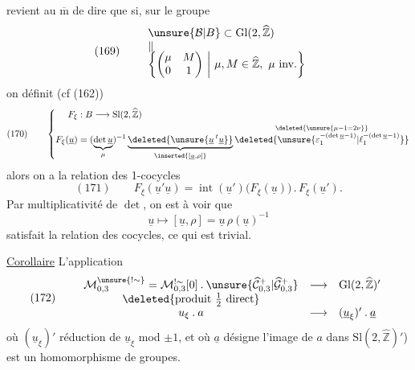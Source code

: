 
 revient au $\overline{\mathrm m}$ de dire que si,
sur le groupe
\[
(169)\qquad
\begin{array}{ll}
\unsure{\mathcal B|B}\subset\mathrm{Gl}(2,\widehat{\mathbb Z})&\\
\Vert&\\[-2pt]
\left\{\begin{pmatrix}\mu&M\\0&1\end{pmatrix}
\ \middle|\ \mu,M\in\widehat{\mathbb Z},\ \mu\text{ inv.}\right\}&
\end{array}
\]
on définit (cf (162))
\[
(170)\qquad
\left\{\begin{aligned}
F_\xi &: B\longrightarrow\mathrm{Sl}(2,\widehat{\mathbb Z})\\
F_\xi(\underline u)
&=(\underbrace{\det\underline u}_{\mu})^{-1}
\underbrace{\deleted{\unsure{\underline u\,{}^t\underline u}}}
_{\inserted{[\underline u,\rho]}}
\overset{\deleted{\unsure{\mu-1=2\nu}}}
{\deleted{\unsure{\varepsilon_1^{-(\det\underline u-1)}|\ell_1^{-(\det\underline u-1)}}}}
\end{aligned}\right.
\]
alors on a la relation des 1-cocycles
\[
(171)\qquad
F_\xi(\underline u'\underline u)
=\operatorname{int}(\underline u')\bigl(F_\xi(\underline u)\bigr)
\mathbin{.}F_\xi(\underline u').
\]
Par multiplicativité de $\det$, on est 
à voir que
\[
\underline u\longmapsto[\underline u,\rho]
=\underline u\,\rho(\underline u)^{-1}
\]
satisfait la relation des cocycles, ce qui est trivial.

\uline{Corollaire} L'application
\[
(172)\qquad
\begin{array}{ccl}
\mathcal M_{0,3}^{\unsure{!\sim}}
=\mathcal M_{0,3}^{!\sim}[0]\mathbin{.}
\unsure{\widehat{\mathcal C}_{0,3}^{+}|\widehat{\mathcal G}_{0,3}^{+}}
&\longrightarrow&\mathrm{Gl}(2,\widehat{\mathbb Z})'\\
\deleted{\text{produit }\tfrac12\text{ direct}}&&\\
u_\xi\mathbin{.}a&\longrightarrow&(\underline u_\xi)'\mathbin{.}\underline a
\end{array}
\]
où $(\underline u_\xi)'$  réduction de $\underline u_\xi$
mod $\pm1$, et où $\underline a$ désigne l'image de $a$ dans
$\mathrm{Sl}(2,\widehat{\mathbb Z})'$) est un homomorphisme de groupes.

